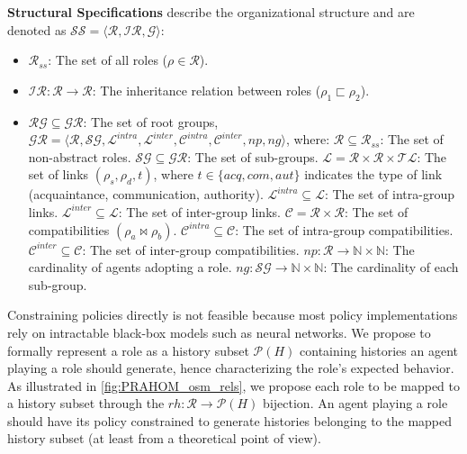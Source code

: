 \documentclass[sigconf,anonymous]{aamas}
\begin{document}
\textbf{Structural Specifications} describe the organizational structure and are denoted as $\mathcal{SS} = \langle \mathcal{R}, \mathcal{IR}, \mathcal{G} \rangle$:

\begin{itemize}
    \item $\mathcal{R}_{ss}$: The set of all roles ($\rho \in \mathcal{R}$).
    \item $\mathcal{IR}: \mathcal{R} \rightarrow \mathcal{R}$: The inheritance relation between roles ($\rho_1 \sqsubset \rho_2$).
    \item $\mathcal{RG} \subseteq \mathcal{GR}$: The set of root groups, $\mathcal{GR} = \langle \mathcal{R}, \mathcal{SG}, \mathcal{L}^{intra}, \mathcal{L}^{inter}, \mathcal{C}^{intra}, \mathcal{C}^{inter}, \allowbreak np, ng \rangle$, where:
          $\mathcal{R} \subseteq \mathcal{R}_{ss}$: The set of non-abstract roles.
          $\mathcal{SG} \subseteq \mathcal{GR}$: The set of sub-groups.
          $\mathcal{L} = \mathcal{R} \times \mathcal{R} \times \mathcal{TL}$: The set of links $(\rho_s, \rho_d, t)$, where $t \in \{acq, com, aut\}$ indicates the type of link (acquaintance, communication, authority).
          $\mathcal{L}^{intra} \subseteq \mathcal{L}$: The set of intra-group links.
          $\mathcal{L}^{inter} \subseteq \mathcal{L}$: The set of inter-group links.
          $\mathcal{C} = \mathcal{R} \times \mathcal{R}$: The set of compatibilities $(\rho_a \bowtie \rho_b)$.
          $\mathcal{C}^{intra} \subseteq \mathcal{C}$: The set of intra-group compatibilities.
          $\mathcal{C}^{inter} \subseteq \mathcal{C}$: The set of inter-group compatibilities.
          $np: \mathcal{R} \rightarrow \mathbb{N} \times \mathbb{N}$: The cardinality of agents adopting a role.
          $ng: \mathcal{SG} \rightarrow \mathbb{N} \times \mathbb{N}$: The cardinality of each sub-group.
\end{itemize}

Constraining policies directly is not feasible because most policy implementations rely on intractable black-box models such as neural networks. We propose to formally represent a role as a history subset $\mathcal{P}(H)$ containing histories an agent playing a role should generate, hence characterizing the role's expected behavior. As illustrated in \autoref{fig:PRAHOM_osm_rels}, we propose each role to be mapped to a history subset through the $rh: \mathcal{R} \rightarrow \mathcal{P}(H)$ bijection. An agent playing a role should have its policy constrained to generate histories belonging to the mapped history subset (at least from a theoretical point of view).
\end{document}
